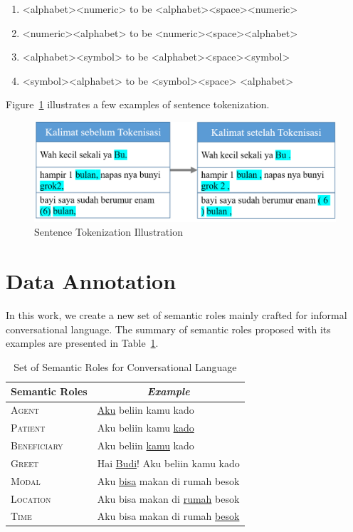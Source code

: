 \begin{enumerate}
	\item <alphabet><numeric> to be <alphabet><space><numeric>
	\item <numeric><alphabet> to be <numeric><space><alphabet>
	\item <alphabet><symbol> to be <alphabet><space><symbol>
	\item <symbol><alphabet> to be <symbol><space> <alphabet>
\end{enumerate}

Figure~\ref{fig:tokenization} illustrates a few examples of sentence tokenization.
\begin{figure}
	\centering
	\includegraphics[width=\linewidth]{images/tokenisasi}
	\caption{Sentence Tokenization Illustration}
	\label{fig:tokenization}
\end{figure}

\section{Data Annotation}
In this work, we create a new set of semantic roles mainly crafted for informal conversational language. The summary of semantic roles proposed with its examples are presented in Table~\ref{tab:semantic_roles}.

\begin{table}
	\centering
	\caption{Set of Semantic Roles for Conversational Language}
	\label{tab:semantic_roles}
	\begin{tabular}{|l|l|}
		\hline
		\multicolumn{1}{|c|}{Semantic Roles} & \multicolumn{1}{c|}{\textit{Example}} \\
		\hline
		\textsc{Agent}		& \underline{Aku} beliin kamu kado\\
		\textsc{Patient}		& Aku beliin kamu \underline{kado}\\
		\textsc{Beneficiary}	& Aku beliin \underline{kamu} kado\\
		\textsc{Greet} 				& Hai \underline{Budi}! Aku beliin kamu kado\\
		\textsc{Modal} 				& Aku \underline{bisa} makan di rumah besok\\
		\textsc{Location} 			& Aku bisa makan di \underline{rumah} besok\\
		\textsc{Time} 				& Aku bisa makan di rumah \underline{besok} \\
		\hline
	\end{tabular}
\end{table}

